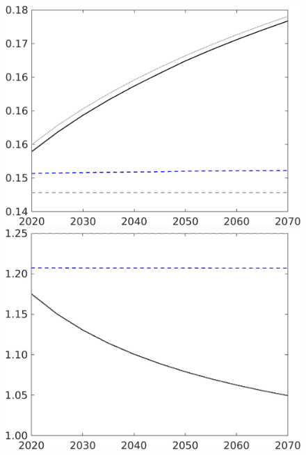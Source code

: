 \begin{figure}[h!!]
\begin{minipage}[]{0.32\textwidth}
	\end{minipage}
	\begin{minipage}[]{0.32\textwidth}
		\includegraphics[width=1\textwidth]{../../codding_model/own_basedOnFried/optimalPol_190722_tidiedUp/figures/all_10Aout22/CountXgrTaulLF_target_LgLf_spillover0_sep1_extern0_PV1_etaa0.79_lgd0.png}
	\end{minipage}
	\begin{minipage}[]{0.32\textwidth}
		\includegraphics[width=1\textwidth]{../../codding_model/own_basedOnFried/optimalPol_190722_tidiedUp/figures/all_10Aout22/CountXgrTaulLF_target_pg_spillover0_sep1_extern0_PV1_etaa0.79_lgd0.png}

\end{minipage}
\end{figure}
